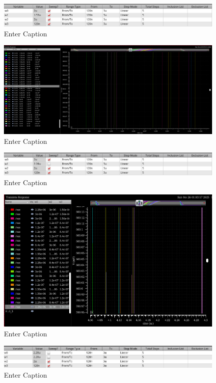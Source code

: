 \documentclass[12pt]{article}
\begin{document}
\newpage

\begin{figure}[H]
    \centering
    \includegraphics[width=0.5\linewidth]{writeup//figures/wmux_all_parametric_sweep_setup.png}
    \caption{Enter Caption}
\end{figure}

\begin{figure}[H]
    \centering
    \includegraphics[width=\linewidth]{writeup//figures/wmux_all_zoomed_parametrics_weep2.png}
    \caption{Enter Caption}
\end{figure}

\begin{figure}
    \centering
    \includegraphics[width=1\linewidth]{writeup//figures/wmux_3_parametric_sweep_setup.png}
    \caption{Enter Caption}
\end{figure}

\begin{figure}[H]
    \centering
    \includegraphics[width=0.5\linewidth]{writeup//figures/wmux_3_parametrics_weep.png}
    \caption{Enter Caption}
\end{figure}

\begin{figure}[H]
    \centering
    \includegraphics[width=0.5\linewidth]{writeup//figures/wmux_2_parametric_sweep_setup.png}
    \caption{Enter Caption}
\end{figure}
\end{document}
